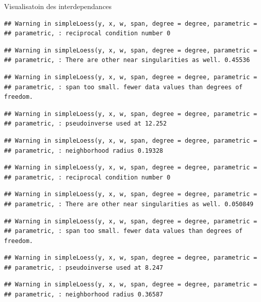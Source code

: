 \documentclass[11pt,ignorenonframetext,]{beamer}
\begin{document}
\begin{frame}[fragile]{Visualisatoin des interdependances}
\begin{verbatim}
## Warning in simpleLoess(y, x, w, span, degree = degree, parametric =
## parametric, : reciprocal condition number 0
\end{verbatim}

\begin{verbatim}
## Warning in simpleLoess(y, x, w, span, degree = degree, parametric =
## parametric, : There are other near singularities as well. 0.45536
\end{verbatim}

\begin{verbatim}
## Warning in simpleLoess(y, x, w, span, degree = degree, parametric =
## parametric, : span too small. fewer data values than degrees of freedom.
\end{verbatim}

\begin{verbatim}
## Warning in simpleLoess(y, x, w, span, degree = degree, parametric =
## parametric, : pseudoinverse used at 12.252
\end{verbatim}

\begin{verbatim}
## Warning in simpleLoess(y, x, w, span, degree = degree, parametric =
## parametric, : neighborhood radius 0.19328
\end{verbatim}

\begin{verbatim}
## Warning in simpleLoess(y, x, w, span, degree = degree, parametric =
## parametric, : reciprocal condition number 0
\end{verbatim}

\begin{verbatim}
## Warning in simpleLoess(y, x, w, span, degree = degree, parametric =
## parametric, : There are other near singularities as well. 0.050849
\end{verbatim}

\begin{verbatim}
## Warning in simpleLoess(y, x, w, span, degree = degree, parametric =
## parametric, : span too small. fewer data values than degrees of freedom.
\end{verbatim}

\begin{verbatim}
## Warning in simpleLoess(y, x, w, span, degree = degree, parametric =
## parametric, : pseudoinverse used at 8.247
\end{verbatim}

\begin{verbatim}
## Warning in simpleLoess(y, x, w, span, degree = degree, parametric =
## parametric, : neighborhood radius 0.36587
\end{verbatim}


\end{frame}
\end{document}
